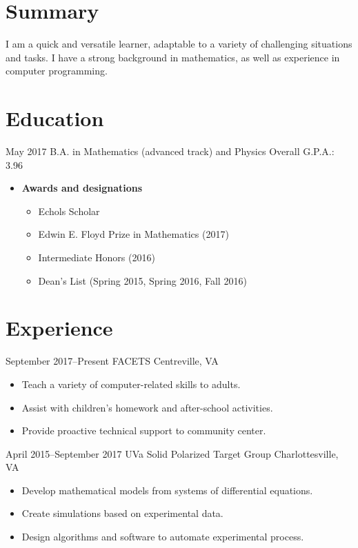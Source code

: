 \documentclass[12pt]{article}
\begin{document}


\section*{Summary}
I am a quick and versatile learner, adaptable to a variety of
challenging situations and tasks. I have a strong background in
mathematics, as well as experience in computer programming.

\section*{Education}
{May 2017}
{B.A. in Mathematics (advanced track) and Physics}
{Overall G.P.A.: 3.96}
\begin{itemize}
\item \textbf{Awards and designations}
  \begin{itemize}
  \item Echols Scholar
  \item Edwin E. Floyd Prize in Mathematics (2017)
  \item Intermediate Honors (2016)
  \item Dean's List (Spring 2015, Spring 2016, Fall 2016)
  \end{itemize}
\end{itemize}

\section*{Experience}
{September 2017--Present}
{FACETS}
{Centreville, VA}
\begin{itemize}
\item Teach a variety of computer-related skills to adults.
\item Assist with children's homework and after-school activities.
\item Provide proactive technical support to community center.
\end{itemize}

{April 2015--September 2017}
{UVa Solid Polarized Target Group}
{Charlottesville, VA}
\begin{itemize}
\item Develop mathematical models from systems of differential equations.
\item Create simulations based on experimental data.
\item Design algorithms and software to automate experimental process.
\end{itemize}
\end{document}
